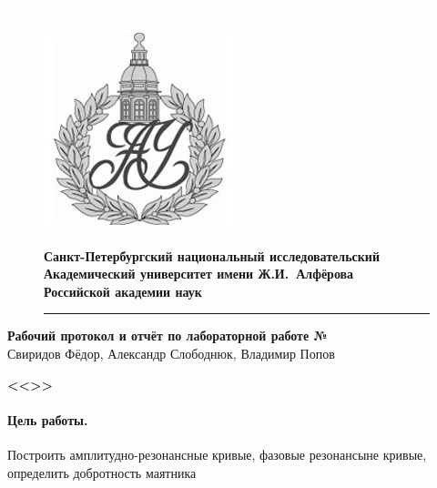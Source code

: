 \documentclass[a4paper]{article}
\begin{document}
	\begin{figure}[htb]
		\begin{minipage}[c]{0.12\textwidth}
			\includegraphics[scale=0.25]{AU}
		\end{minipage}
		\hfill
		\begin{minipage}[t]{0.9\textwidth}
			{\Large\bfseries Санкт-Петербургский национальный исследовательский Академический университет имени Ж.И.~Алфёрова\\Российской академии наук}
		\end{minipage}
		\rule{164mm}{0.3mm}
	\end{figure}
	
	\begin{center}
		{\large\textbf{Рабочий протокол и отчёт по лабораторной работе № }}\\
		Свиридов Фёдор, Александр Слободнюк, Владимир Попов
	\end{center}
	\begin{center}
		\Large\bfseries{<<>>}\\
	\end{center}
	
		\paragraph{Цель работы.} Построить амплитудно-резонансные кривые, фазовые резонансыне кривые, определить добротность маятника
		
\end{document}
